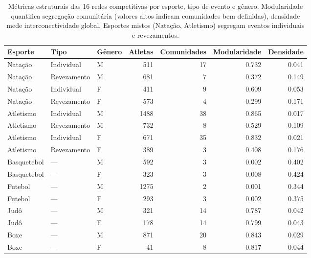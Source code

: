\begin{table}[htbp]
\caption{Métricas estruturais das 16 redes competitivas por esporte, tipo de evento e gênero. Modularidade quantifica segregação comunitária (valores altos indicam comunidades bem definidas), densidade mede interconectividade global. Esportes mistos (Natação, Atletismo) segregam eventos individuais e revezamentos.}
\label{tab:structural_metrics_summary}
\centering
\footnotesize
\begin{tabular}{lllrrrr}
\toprule
\textbf{Esporte} & \textbf{Tipo} & \textbf{Gênero} & \textbf{Atletas} & \textbf{Comunidades} & \textbf{Modularidade} & \textbf{Densidade} \\
\midrule
Natação & Individual & M & 511 & 17 & 0.732 & 0.041 \\
Natação & Revezamento & M & 681 & 7 & 0.372 & 0.149 \\
Natação & Individual & F & 411 & 9 & 0.609 & 0.053 \\
Natação & Revezamento & F & 573 & 4 & 0.299 & 0.171 \\
Atletismo & Individual & M & 1488 & 38 & 0.865 & 0.017 \\
Atletismo & Revezamento & M & 732 & 8 & 0.529 & 0.109 \\
Atletismo & Individual & F & 671 & 35 & 0.832 & 0.021 \\
Atletismo & Revezamento & F & 389 & 3 & 0.408 & 0.176 \\
Basquetebol & — & M & 592 & 3 & 0.002 & 0.402 \\
Basquetebol & — & F & 323 & 3 & 0.008 & 0.424 \\
Futebol & — & M & 1275 & 2 & 0.001 & 0.344 \\
Futebol & — & F & 293 & 3 & 0.002 & 0.375 \\
Judô & — & M & 321 & 14 & 0.787 & 0.042 \\
Judô & — & F & 178 & 14 & 0.799 & 0.043 \\
Boxe & — & M & 871 & 20 & 0.843 & 0.029 \\
Boxe & — & F & 41 & 8 & 0.817 & 0.044 \\
\bottomrule
\end{tabular}
\end{table}
